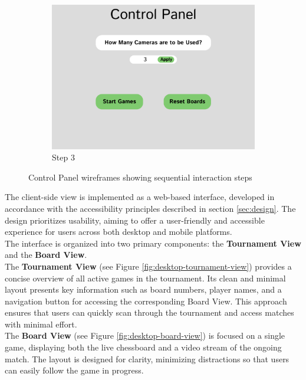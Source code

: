 \begin{figure}[h!]
    \begin{subfigure}[h!]{0.40\linewidth}
        \centering
        \includegraphics[width=\linewidth]{figures/methods/wireframes/control-panel-3.png}
        \caption{Step 3}
        \label{fig:control-panel-3}
    \end{subfigure}
    
    \caption[Control panel wireframes]{Control Panel wireframes showing sequential interaction steps}
    \label{fig:control-panel-group}
\end{figure}


The client-side view is implemented as a web-based interface, developed in accordance with the accessibility principles described in section \ref{sec:design}. The design prioritizes usability, aiming to offer a user-friendly and accessible experience for users across both desktop and mobile platforms. \\

The interface is organized into two primary components: the \textbf{Tournament View} and the \textbf{Board View}. \\

The \textbf{Tournament View} (see Figure \ref{fig:desktop-tournament-view}) provides a concise overview of all active games in the tournament. Its clean and minimal layout presents key information such as board numbers, player names, and a navigation button for accessing the corresponding Board View. This approach ensures that users can quickly scan through the tournament and access matches with minimal effort. \\

The \textbf{Board View} (see Figure \ref{fig:desktop-board-view}) is focused on a single game, displaying both the live chessboard and a video stream of the ongoing match. The layout is designed for clarity, minimizing distractions so that users can easily follow the game in progress. \\

